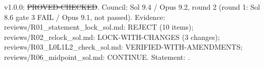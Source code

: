 \begin{theorem}\label{reg:W2-FAC-PK_Thm-NEG}
\end{theorem}
\begin{statusbox}
 v1.0.0: \st{PROVED-CHECKED}. Council: Sol 9.4 / Opus 9.2, round 2 (round 1: Sol 8.6 gate 3 FAIL / Opus 9.1, not passed). Evidence: reviews/R01\_statement\_lock\_sol.md: REJECT (10 items); reviews/R02\_relock\_sol.md: LOCK-WITH-CHANGES (3 changes); reviews/R03\_L0L1L2\_check\_sol.md: VERIFIED-WITH-AMENDMENTS; reviews/R06\_midpoint\_sol.md: CONTINUE. Statement: .
\end{statusbox}
